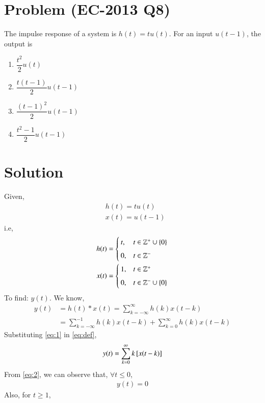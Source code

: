 \documentclass[journal,12pt,twocolumn]{IEEEtran}
\begin{document}
\section{Problem (EC-2013 Q8)}
The impulse response of a system is $h(t)=tu(t)$. For an input $u(t-1)$, the output is 
\begin{enumerate}
    \item $\dfrac{t^{2}}{2}u(t)$
    \item $\dfrac{t(t-1)}{2}u(t-1)$
    \item $\dfrac{(t-1)^{2}}{2}u(t-1)$
    \item $\dfrac{t^{2}-1}{2}u(t-1)$
\end{enumerate}
\section{Solution}
Given,
\begin{align}
    &h(t)=tu(t)\\
    &x(t)=u(t-1)
\end{align}
i.e,
\begin{align}
    \label{eq:1}
    h(t)=\begin{cases}
	t, & t \in \mathbb{Z}^{+} \cup \left\{0\right\} \\~\\[-1em]
	0, & t \in \mathbb{Z}^{-}
	\end{cases}\\
	\label{eq:2}
	x(t)=\begin{cases}
	1, & t \in \mathbb{Z}^{+} \\~\\[-1em]
	0, & t \in \mathbb{Z}^{-} \cup \left\{0\right\}
	\end{cases} 
\end{align}
To find: $y(t)$. We know, 
\begin{align}
y(t)&=h(t)*x(t)=\displaystyle\sum_{k=-\infty}^{\infty}h(k)x(t-k)\\
&=\displaystyle\sum_{k=-\infty}^{-1}h(k)x(t-k)+\displaystyle\sum_{k=0}^{\infty}h(k)x(t-k)
\label{eq:def}
\end{align}
Substituting \eqref{eq:1} in \eqref{eq:def}, 
\begin{align}
y(t)=\displaystyle\sum_{k=0}^{\infty}k{}\left[x(t-k)\right]
\end{align}
From \eqref{eq:2}, we can observe that, $\forall t\leq 0$,
\begin{align}
y(t)=0 
\end{align}
Also, for $t \geq 1$,
\end{document}
